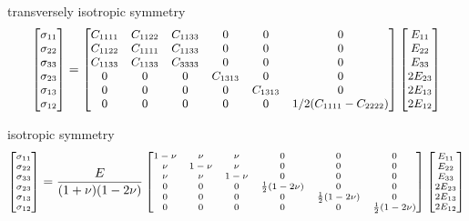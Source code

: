 \documentclass[
  letterpaper,
  ignorenonframetext,
  aspectratio=43,
  handout,
  12pt]{beamer}
\begin{document}
\begin{frame}{transversely isotropic symmetry}
\protect\hypertarget{transversely-isotropic-symmetry}{}
\[\small \begin{bmatrix}
  \sigma_{11}\\
\sigma_{22} \\
\sigma_{33} \\
\sigma_{23} \\
\sigma_{13} \\
\sigma_{12}
  \end{bmatrix}
  = \begin{bmatrix}
  C_{1111} & C_{1122} & C_{1133} & 0 & 0 & 0 \\
  C_{1122} & C_{1111} & C_{1133} & 0 & 0 & 0 \\
  C_{1133} & C_{1133} & C_{3333} & 0 & 0 & 0 \\
  0 & 0 & 0 & C_{1313} & 0 & 0 \\
  0 & 0 & 0 & 0 & C_{1313} & 0 \\
  0 & 0 & 0 & 0 & 0 & 1/2(C_{1111}-C_{2222})
  \end{bmatrix}\begin{bmatrix}
  E_{11}\\
E_{22} \\
E_{33} \\
2E_{23} \\
2E_{13} \\
2E_{12}
\end{bmatrix}\]
\end{frame}

\begin{frame}{isotropic symmetry}
\protect\hypertarget{isotropic-symmetry}{}
\[\scriptsize \begin{bmatrix}
  \sigma_{11}\\
\sigma_{22} \\
\sigma_{33} \\
\sigma_{23} \\
\sigma_{13} \\
\sigma_{12}
  \end{bmatrix}
  = \frac{E}{(1+\nu)(1-2\nu)}\begin{bmatrix}
  1-\nu & \nu & \nu & 0 & 0 & 0 \\
  \nu & 1-\nu & \nu & 0 & 0 & 0 \\
  \nu & \nu & 1-\nu & 0 & 0 & 0 \\
  0 & 0 & 0 & \frac{1}{2}(1-2\nu) & 0 & 0 \\
  0 & 0 & 0 & 0 & \frac{1}{2}(1-2\nu) & 0 \\
  0 & 0 & 0 & 0 & 0 & \frac{1}{2}(1-2\nu)
  \end{bmatrix}\begin{bmatrix}
  E_{11}\\
E_{22} \\
E_{33} \\
2E_{23} \\
2E_{13} \\
2E_{12}
\end{bmatrix}\]
\end{frame}
\end{document}
